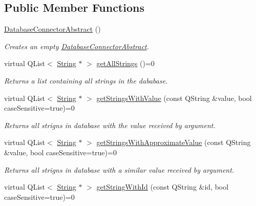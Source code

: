\subsection*{Public Member Functions}
\begin{DoxyCompactItemize}
\item 
\mbox{\label{classDatabaseConnectorAbstract_a0a5f40156183723e5e01d5ab50418118}} 
\mbox{\hyperlink{classDatabaseConnectorAbstract_a0a5f40156183723e5e01d5ab50418118}{Database\+Connector\+Abstract}} ()
\begin{DoxyCompactList}\small\item\em Creates an empty \mbox{\hyperlink{classDatabaseConnectorAbstract}{Database\+Connector\+Abstract}}. \end{DoxyCompactList}\item 
virtual Q\+List$<$ \mbox{\hyperlink{classString}{String}} $\ast$ $>$ \mbox{\hyperlink{classDatabaseConnectorAbstract_aeb4347bc18b6bed9a9b6120f68c10e9d}{get\+All\+Strings}} ()=0
\begin{DoxyCompactList}\small\item\em Returns a list containing all strings in the dababase. \end{DoxyCompactList}\item 
virtual Q\+List$<$ \mbox{\hyperlink{classString}{String}} $\ast$ $>$ \mbox{\hyperlink{classDatabaseConnectorAbstract_a1d33547045c5f8619f44290c932edb1b}{get\+Strings\+With\+Value}} (const Q\+String \&value, bool case\+Sensitive=true)=0
\begin{DoxyCompactList}\small\item\em Returns all strigns in database with the value received by argument. \end{DoxyCompactList}\item 
virtual Q\+List$<$ \mbox{\hyperlink{classString}{String}} $\ast$ $>$ \mbox{\hyperlink{classDatabaseConnectorAbstract_a5b0f30372ca105a94073267e969b74ee}{get\+Strings\+With\+Approximate\+Value}} (const Q\+String \&value, bool case\+Sensitive=true)=0
\begin{DoxyCompactList}\small\item\em Returns all strigns in database with a similar value received by argument. \end{DoxyCompactList}\item 
virtual Q\+List$<$ \mbox{\hyperlink{classString}{String}} $\ast$ $>$ \mbox{\hyperlink{classDatabaseConnectorAbstract_a757f25feaf50af012d25db8f27b1fef4}{get\+String\+With\+Id}} (const Q\+String \&id, bool case\+Sensitive=true)=0

\end{DoxyCompactItemize}
